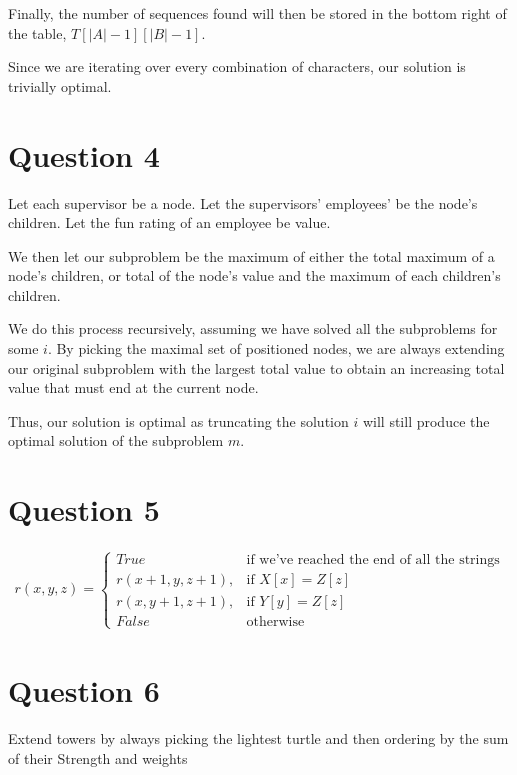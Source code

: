 \documentclass{article}
\begin{document}
Finally, the number of sequences found will then be stored in the bottom right of the table, $T[|A|-1][|B|-1]$.

Since we are iterating over every combination of characters, our solution is trivially optimal.

\section*{Question 4}
Let each supervisor be a node.
Let the supervisors' employees' be the node's children.
Let the fun rating of an employee be value.

We then let our subproblem be the maximum of either the total maximum of a node's children, or total of the node's value and the maximum of each children's children.

We do this process recursively, assuming we have solved all the subproblems for some $i$. By picking the maximal set of positioned nodes, we are always extending our original subproblem with the largest total value to obtain an increasing total value that must end at the current node.

Thus, our solution is optimal as truncating the solution $i$ will still produce the optimal solution of the subproblem $m$.

\section*{Question 5}
\begin{align*}
r(x, y, z) =
\begin{cases}
    True            & \text{if we've reached the end of all the strings}\\
    r(x+1, y, z+1), & \text{if } X[x] = Z[z]\\
    r(x, y+1, z+1), & \text{if } Y[y] = Z[z]\\
    False           & \text{otherwise}
\end{cases}
\end{align*}

\section*{Question 6}
Extend towers by always picking the lightest turtle and then ordering by the sum of their Strength and weights
\end{document}
